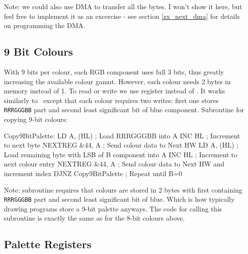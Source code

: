 Note: we could also use DMA to transfer all the bytes. I won't show it here, but feel free to implement it as an excercise - see section \ref{zx_next_dma} for details on programming the DMA.


\subsection{9 Bit Colours}

With 9 bits per colour, each RGB component uses full 3 bits, thus greatly increasing the available colour gamut. However, each colour needs 2 bytes in memory instead of 1. To read or write we use  register instead of . It works similarly to ~except that each colour requires two writes: first one stores {\tt RRRGGGBB} part and second least significant bit of blue component. Subroutine for copying 9-bit colours:

\begin{tcblisting}{}
Copy9BitPalette:
	LD A, (HL)                ; Load RRRGGGBB into A
	INC HL                    ; Increment to next byte
	NEXTREG &44, A            ; Send colour data to Next HW
	LD A, (HL)                ; Load remaining byte with LSB of B component into A
	INC HL                    ; Increment to next colour entry
	NEXTREG &44, A            ; Send colour data to Next HW and increment index
	DJNZ Copy9BitPalette      ; Repeat until B=0
\end{tcblisting}

Note: subroutine requires that colours are stored in 2 bytes with first containing {\tt RRRGGGBB} part and second least significant bit of blue. Which is how typically drawing programs store a 9-bit palette anyways. The code for calling this subroutine is exactly the same as for the 8-bit colours above.


\subsection{Palette Registers}
\label{zx_next_palette_registers}

\subsubsection{}

\begin{NextPort}
\end{NextPort}

